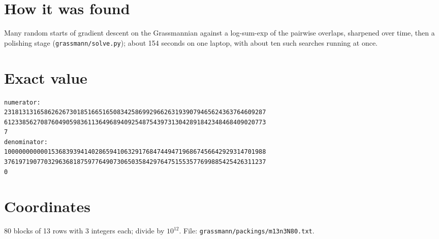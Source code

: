 \documentclass[11pt,a4paper]{article}
\begin{document}
\section{How it was found}
Many random starts of gradient descent on the Grassmannian against a log-sum-exp of the pairwise overlaps, sharpened over time, then a polishing stage (\texttt{grassmann/solve.py}); about 154 seconds on one laptop, with about ten such searches running at once.


\appendix
\section{Exact value}
{\small
\begin{verbatim}
numerator:
231813131658626267301851665165083425869929662631939079465624363764609287
612338562708760490598361136496894092548754397313042891842348468409020773
7
denominator:
100000000000153683939414028659410632917684744947196867456642929314701988
376197190770329636818759776490730650358429764751553577699885425426311237
0
\end{verbatim}}

\section{Coordinates}
80 blocks of 13 rows with 3 integers each; divide by $10^{12}$. File: \texttt{grassmann/packings/m13n3N80.txt}.
{\tiny
\begin{multicols}{3}
\end{multicols}}
\end{document}
